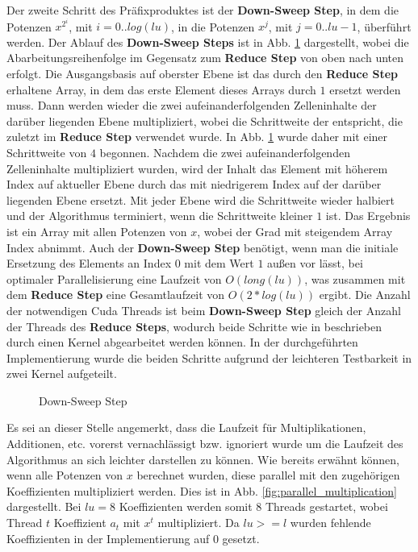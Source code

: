 Der zweite Schritt des Präfixproduktes ist der \textbf{Down-Sweep Step}, in dem die Potenzen $x^{2^i}$, mit $i=0..log(lu)$, in die Potenzen $x^j$, mit $j=0..lu-1$, überführt werden. Der Ablauf des \textbf{Down-Sweep Steps} ist in Abb. \ref{fig:down_sweep_step} dargestellt, wobei die Abarbeitungsreihenfolge im Gegensatz zum \textbf{Reduce Step} von oben nach unten erfolgt. Die Ausgangsbasis auf oberster Ebene ist das durch den \textbf{Reduce Step} erhaltene Array, in dem das erste Element dieses Arrays durch $1$ ersetzt werden muss. Dann werden wieder die zwei aufeinanderfolgenden Zelleninhalte der darüber liegenden Ebene multipliziert, wobei die Schrittweite der entspricht, die zuletzt im \textbf{Reduce Step} verwendet wurde. In Abb. \ref{fig:down_sweep_step} wurde daher mit einer Schrittweite von $4$ begonnen. Nachdem die zwei aufeinanderfolgenden Zelleninhalte multipliziert wurden, wird der Inhalt das Element mit höherem Index auf aktueller Ebene durch das mit niedrigerem Index auf der darüber liegenden Ebene ersetzt. Mit jeder Ebene wird die Schrittweite wieder halbiert und der Algorithmus terminiert, wenn die Schrittweite kleiner $1$ ist. Das Ergebnis ist ein Array mit allen Potenzen von $x$, wobei der Grad mit steigendem Array Index abnimmt. Auch der \textbf{Down-Sweep Step} benötigt, wenn man die initiale Ersetzung des Elements an Index $0$ mit dem Wert $1$ außen vor lässt, bei optimaler Parallelisierung eine Laufzeit von $O(long(lu))$, was zusammen mit dem \textbf{Reduce Step} eine Gesamtlaufzeit von $O(2*log(lu))$ ergibt. Die Anzahl der notwendigen Cuda Threads ist beim \textbf{Down-Sweep Step} gleich der Anzahl der Threads des \textbf{Reduce Steps}, wodurch beide Schritte wie in \cite{Harris:2014} beschrieben durch einen Kernel abgearbeitet werden können. In der durchgeführten Implementierung wurde die beiden Schritte aufgrund der leichteren Testbarkeit in zwei Kernel aufgeteilt.\newline

\begin{figure}[!htb]
\centering

\caption{Down-Sweep Step} \label{fig:down_sweep_step}
\end{figure}

Es sei an dieser Stelle angemerkt, dass die Laufzeit für Multiplikationen, Additionen, etc. vorerst vernachlässigt bzw. ignoriert wurde um die Laufzeit des Algorithmus an sich leichter darstellen zu können.\newline
Wie bereits erwähnt können, wenn alle Potenzen von $x$ berechnet wurden, diese parallel mit den zugehörigen Koeffizienten multipliziert werden. Dies ist in Abb. \ref{fig:parallel_multiplication} dargestellt. Bei $lu = 8$ Koeffizienten werden somit 8 Threads gestartet, wobei Thread $t$ Koeffizient $a_t$ mit $x^t$ multipliziert. Da $lu >= l$ wurden fehlende Koeffizienten in der Implementierung auf 0 gesetzt.

